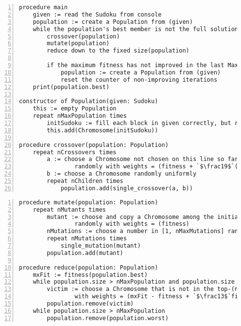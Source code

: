 \documentclass[10pt]{article}
\begin{document}
\begin{lstlisting}[numbers=left, keywords={if,for,while,and,procedure,Sudoku,repeat,times,
    Chromosome,Population,read,print,crossover,mutate,reduce,main,
    fitness,constructor,this}, escapechar=`]
procedure main
    given := read the Sudoku from console
    population := create a Population from (given)
    while the population's best member is not the full solution
        crossover(population)
        mutate(population)
        reduce down to the fixed size(population)

        if the maximum fitness has not improved in the last MaxPatience iterations
            population := create a Population from (given)
            reset the counter of non-improving iterations
    print(population.best)

constructor of Population(given: Sudoku)
    this := empty Population
    repeat nMaxPopulation times
        initSudoku := fill each block in given correctly, but randomly
        this.add(Chromosome(initSudoku))

procedure crossover(population: Population)
    repeat nCrossovers times
        a := choose a Chromosome not chosen on this line so far
                randomly with weights = (fitness + `$\frac19$`(fitness_range))
        b := choose a Chromosome randomly uniformly
        repeat nChildren times
            population.add(single_crossover(a, b))
\end{lstlisting}
\pagebreak
\begin{lstlisting}[numbers=left, firstnumber=last, keywords={if,for,while,and,procedure,Sudoku,repeat,times,
	Chromosome,Population,read,print,crossover,mutate,reduce,main,
	fitness,constructor,this}, escapechar=`]
procedure mutate(population: Population)
    repeat nMutants times
        mutant := choose and copy a Chromosome among the initial ones
                randomly with weights = (fitness)
        nMutations := choose a number in [1, nMaxMutations] randomly uniformly
        repeat nMutations times
            single_mutation(mutant)
        population.add(mutant)
    
procedure reduce(population: Population)
    mxFit := fitness(population.best)
    while population.size > nMaxPopulation and population.size > nElites:
        victim := choose a Chromosome that is not in the top-(nElites) randomly
                with weights = (mxFit - fitness + `$\frac13$`fitness_range)
        population.remove(victim)
    while population.size > nMaxPopulation
        population.remove(population.worst)
\end{lstlisting}
\end{document}
